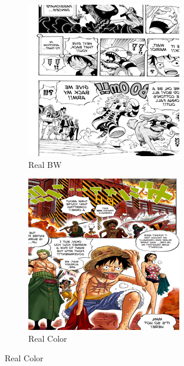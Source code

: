 \begin{figure}
    \centering
      \begin{subfigure}[b]{0.3\textwidth}
        \includegraphics[width=\textwidth]{chapter/output/epoch100_real_A.png}
        \caption{Real BW}
    \end{subfigure}  
    \hfill
    \begin{subfigure}[b]{0.3\textwidth}
        \includegraphics[width=\textwidth]{chapter/output/epoch100_real_B.png}
        \caption{Real Color}
    \end{subfigure}
\end{figure}

